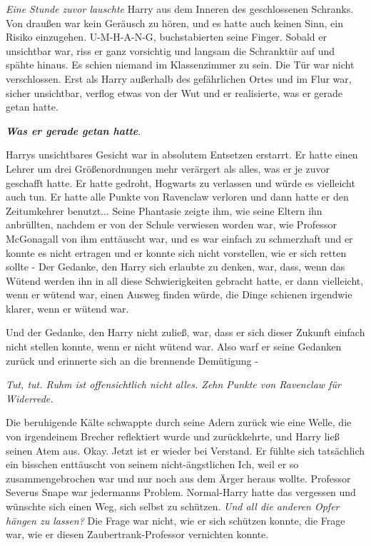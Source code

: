 \emph{Eine Stunde zuvor lauschte} Harry aus dem Inneren des geschlossenen
Schranks. Von draußen war kein Geräusch zu hören, und es hatte auch keinen Sinn,
ein Risiko einzugehen. U-M-H-A-N-G, buchstabierten seine Finger. Sobald er
unsichtbar war, riss er ganz vorsichtig und langsam die Schranktür auf und
spähte hinaus. Es schien niemand im Klassenzimmer zu sein. Die Tür war nicht
verschlossen. Erst als Harry außerhalb des gefährlichen Ortes und im Flur war,
sicher unsichtbar, verflog etwas von der Wut und er realisierte, was er gerade
getan hatte.

\textbf{\emph{Was er gerade getan hatte}}.

Harrys unsichtbares Gesicht war in absolutem Entsetzen erstarrt. Er hatte einen
Lehrer um drei Größenordnungen mehr verärgert als alles, was er je zuvor
geschafft hatte. Er hatte gedroht, Hogwarts zu verlassen und würde es vielleicht
auch tun. Er hatte alle Punkte von Ravenclaw verloren und dann hatte er den
Zeitumkehrer benutzt... Seine Phantasie zeigte ihm, wie seine Eltern ihn
anbrüllten, nachdem er von der Schule verwiesen worden war, wie Professor
McGonagall von ihm enttäuscht war, und es war einfach zu schmerzhaft und er
konnte es nicht ertragen und er konnte sich nicht vorstellen, wie er sich retten
sollte - Der Gedanke, den Harry sich erlaubte zu denken, war, dass, wenn das
Wütend werden ihn in all diese Schwierigkeiten gebracht hatte, er dann
vielleicht, wenn er wütend war, einen Ausweg finden würde, die Dinge schienen
irgendwie klarer, wenn er wütend war.

Und der Gedanke, den Harry nicht zuließ, war, dass er sich dieser Zukunft
einfach nicht stellen konnte, wenn er nicht wütend war. Also warf er seine
Gedanken zurück und erinnerte sich an die brennende Demütigung -

\emph{Tut, tut. Ruhm ist offensichtlich nicht alles. Zehn Punkte von Ravenclaw
für Widerrede.}

Die beruhigende Kälte schwappte durch seine Adern zurück wie eine Welle, die von
irgendeinem Brecher reflektiert wurde und zurückkehrte, und Harry ließ seinen
Atem aus. Okay. Jetzt ist er wieder bei Verstand. Er fühlte sich tatsächlich ein
bisschen enttäuscht von seinem nicht-ängstlichen Ich, weil er so
zusammengebrochen war und nur noch aus dem Ärger heraus wollte. Professor
Severus Snape war jedermanns Problem. Normal-Harry hatte das vergessen und
wünschte sich einen Weg, sich selbst zu schützen. \emph{Und all die anderen
Opfer hängen zu lassen?} Die Frage war nicht, wie er sich schützen konnte, die
Frage war, wie er diesen Zaubertrank-Professor vernichten konnte.

